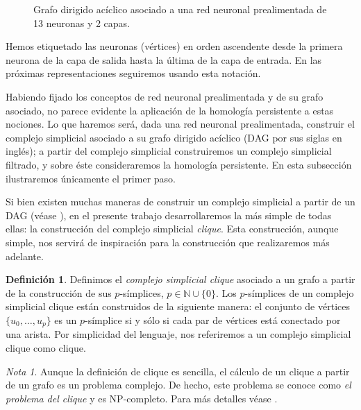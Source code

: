 \documentclass[12pt, a4paper, twoside]{book}
\numberwithin{equation}{section}
\theoremstyle{definition}
\newtheorem{defi}{Definición}
\newenvironment{ejem}
  {\pushQED{\qed}\renewcommand{\qedsymbol}{$\blacktriangleleft$}\ejemplo}
  {\popQED\endejemplo}
\theoremstyle{remark}
\newtheorem*{remark}{Nota}
\theoremstyle{plain}
\begin{document}
\begin{ejem}
\begin{figure}[H]
			\caption{Grafo dirigido acíclico asociado a una red neuronal prealimentada de 13 neuronas y 2 capas.}
			\label{fig:redEjem}
		\end{figure}
		Hemos etiquetado las neuronas (vértices) en orden ascendente 
		desde la primera neurona de la capa de salida hasta la última
		de la capa de entrada. En las próximas representaciones 
		seguiremos usando esta notación.
	\end{ejem}
	
	Habiendo fijado los conceptos de red neuronal prealimentada y de su 
	grafo asociado, no parece evidente la aplicación de la homología 
	persistente a estas nociones. Lo que haremos será, dada una red 
	neuronal prealimentada, construir el complejo simplicial asociado a su
	grafo dirigido acíclico (DAG por sus siglas en inglés); a partir del 
	complejo simplicial construiremos un complejo simplicial filtrado, y 
	sobre éste consideraremos la homología persistente. En esta subsección
	ilustraremos únicamente el primer paso.

	Si bien existen muchas maneras de construir un complejo simplicial a 
	partir de un DAG (véase \cite{Clique-Jakob}), en el presente trabajo desarrollaremos la más simple
	de todas ellas: la construcción del complejo simplicial \emph{clique}. 
	Esta construcción, aunque simple, nos servirá de inspiración para la 
	construcción que realizaremos más adelante. 
	
	\begin{defi}
		Definimos el \textit{complejo simplicial clique} asociado a un
		grafo a partir de la construcción de sus $p$-símplices, $p \in 
		\mathbb{N}\cup\{0\}$. Los $p$-símplices de un complejo 
		simplicial clique están construidos de la siguiente manera: el 
		conjunto de vértices $\{u_{0},\dots,u_{p}\}$ es un 
		$p$-símplice si y sólo si cada par de vértices está conectado 
		por una arista. Por simplicidad del lenguaje, nos referiremos
		a un complejo simplicial clique como clique.
	\end{defi}

	\begin{remark}
		Aunque la definición de clique es sencilla, el cálculo de un 
		clique a partir de un grafo es un problema complejo. De hecho,
		este problema se conoce como \emph{el problema del clique} y 
		es NP-completo. Para más detalles véase \cite{NP-Karp}.
	\end{remark}
\end{document}

